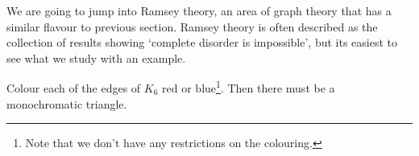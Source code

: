 We are going to jump into Ramsey theory, an area of graph theory that has a similar flavour to previous section. Ramsey theory is often described as the collection of results showing `complete disorder is impossible', but its easiest to see what we study with an example.

\begin{proposition}
	Colour each of the edges of $K_6$ red or blue\footnote{Note that we don't have any restrictions on the colouring.}. Then there must be a monochromatic triangle.
	\begin{center}
		


\begin{tikzpicture}[x=0.75pt,y=0.75pt,yscale=-1,xscale=1]


\end{tikzpicture}
\end{center}
\end{proposition}
